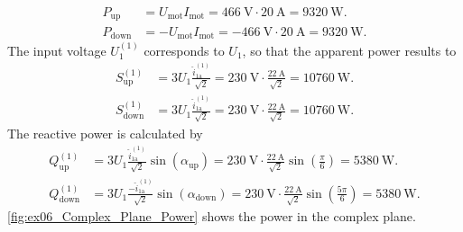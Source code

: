 \begin{solutionblock}
    \begin{equation}
        \begin{split}
            P_\mathrm{up}&=U_\mathrm{mot} I_\mathrm{mot}=\SI{466}{\volt} \cdot \SI{20}{\ampere}= \SI{9320}{\watt}. \\
            P_\mathrm{down}&=-U_\mathrm{mot} I_\mathrm{mot}=\SI{-466}{\volt} \cdot \SI{20}{\ampere}= \SI{9320}{\watt}.
        \end{split}
    \end{equation}
    The input voltage $U_\mathrm{1}^\mathrm{(1)}$ corresponds to $U_\mathrm{1}$, so that the apparent power results to
    \begin{equation}
        \begin{split}
            S_\mathrm{up}^\mathrm{(1)}&=3 U_\mathrm{1} \frac{\hat{i}_\mathrm{1a}^\mathrm{(1)}}{\sqrt{2}}=\SI{230}{\volt} \cdot \frac{\SI{22}{\ampere}}{\sqrt{2}}= \SI{10760}{\watt}. \\
            S_\mathrm{down}^\mathrm{(1)}&=3 U_\mathrm{1} \frac{\hat{i}_\mathrm{1a}^\mathrm{(1)}}{\sqrt{2}}=\SI{230}{\volt} \cdot \frac{\SI{22}{\ampere}}{\sqrt{2}}= \SI{10760}{\watt}.
        \end{split}
    \end{equation}
    The reactive power is calculated by
    \begin{equation}
        \begin{split}
            Q_\mathrm{up}^\mathrm{(1)}&=3 U_\mathrm{1} \frac{\hat{i}_\mathrm{1a}^\mathrm{(1)}}{\sqrt{2}} \sin{(\alpha_\mathrm{up})}
            =\SI{230}{\volt} \cdot \frac{\SI{22}{\ampere}}{\sqrt{2}}\sin{(\frac{\pi}{6})}= \SI{5380}{\watt}. \\
            Q_\mathrm{down}^\mathrm{(1)}&=3 U_\mathrm{1} \frac{-\hat{i}_\mathrm{1a}^\mathrm{(1)}}{\sqrt{2}} \sin{(\alpha_\mathrm{down})}
            =\SI{230}{\volt} \cdot \frac{\SI{22}{\ampere}}{\sqrt{2}}\sin{(\frac{5\pi}{6})}= \SI{5380}{\watt}.
        \end{split}
    \end{equation}
    \autoref{fig:ex06_Complex_Plane_Power} shows the power in the complex plane.

    

\end{solutionblock}
